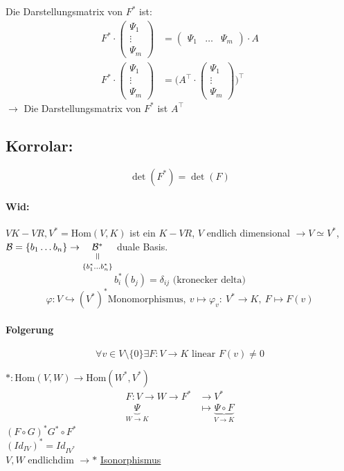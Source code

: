 \documentclass[titlepage,12pt,a4paper,ngerman]{report}
\newcommand{\verteq}{\rotatebox{90}{$\,=$}}
\newcommand{\equalto}[2]{\underset{\scriptstyle\overset{\mkern4mu\verteq}{#2}}{#1}}
\newcommand{\tx}[1]{\textrm{#1}}
\newcommand{\ub}[1]{\underbrace{#1}}
\begin{document}
Die Darstellungsmatrix von $ F^* $ ist:
\begin{align*}
F^* \cdot \begin{pmatrix}
\Psi_1\\
\vdots \\
\Psi_m
\end{pmatrix} &= \begin{pmatrix}
\Psi_1 & \dots & \Psi_m
\end{pmatrix} \cdot A\\
F^* \cdot \begin{pmatrix}
\Psi_1\\
\vdots \\
\Psi_m
\end{pmatrix} &= \bigg( A^\top \cdot \begin{pmatrix}
\Psi_1\\
\vdots\\
\Psi_m
\end{pmatrix} \bigg)^\top
\end{align*}
$ \rightarrow $ Die Darstellungsmatrix von $ F^* $ ist $ A^\top $
\subsection{Korrolar:}
$$ \det(F^*) = \det(F) $$


\paragraph{Wid:}
$V K-VR, V^* = \tx{Hom} (V,K)$ ist ein $K-VR$, $V$ endlich dimensional $\rightarrow V \simeq V^*$, $\mathcal B = \{b_1 \dots b_n\} \rightarrow \equalto{\mathcal{B}^*}{\{b_1^* \dots b_n^*\}}$ duale Basis.
$$b_i^* (b_j) = \delta_{ij} \tx{ (kronecker delta)}$$
$$\varphi: V \hookrightarrow (V^*)^* \tx{Monomorphismus},\ v \mapsto \varphi_v:\ V^* \to K,\ F \mapsto F(v)$$ 
\paragraph{Folgerung}
$$\forall v \in V \setminus \{0\} \exists F: V \to K \tx{ linear } F(v) \neq 0$$

$ * : \tx{Hom}(V,W) \to \tx{Hom}(W^*,V^*) $\\
\begin{align*}
F: V \to W \rightarrow F^* &\to V^* \\
\ub{\Psi}_{W \to K} &\mapsto \ub{ \Psi \circ F}_{ V \to K} 
\end{align*}
$ (F\circ G)^* G^* \circ F^* $\\
$ (Id_{IV})^* = Id_{IV^*} $\\
$ V,W $ endlichdim $ \rightarrow * $ \underline{\underline{Isonorphismus}} 
\end{document}
